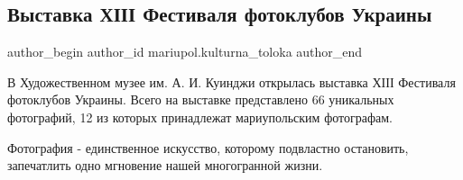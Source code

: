  
 
 
 
 

\subsection{Выставка ХІІІ Фестиваля фотоклубов Украины}
\label{sec:06_02_2019.fb.mariupol.kulturna_toloka.1.vystavka_xiii_festivalja_fotoklubov_ukrainy}

\ifcmt
 author_begin
   author_id mariupol.kulturna_toloka
 author_end
\fi

В Художественном музее им. А. И. Куинджи открылась выставка ХІІІ Фестиваля
фотоклубов Украины. Всего на выставке представлено 66 уникальных фотографий, 12
из которых принадлежат мариупольским фотографам. 

Фотография - единственное искусство, которому подвластно остановить, запечатлить
одно мгновение нашей многогранной жизни.
